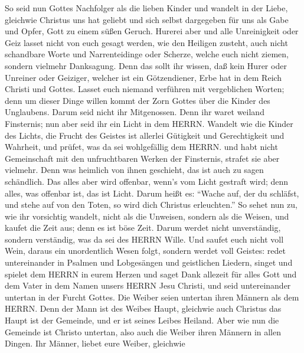  So seid nun Gottes Nachfolger als die lieben Kinder
 und wandelt in der Liebe, gleichwie Christus uns hat
geliebt und sich selbst dargegeben für uns als Gabe und Opfer, Gott zu
einem süßen Geruch.  Hurerei aber und alle Unreinigkeit oder
Geiz lasset nicht von euch gesagt werden, wie den Heiligen zusteht,
 auch nicht schandbare Worte und Narrenteidinge oder
Scherze, welche euch nicht ziemen, sondern vielmehr Danksagung.
 Denn das sollt ihr wissen, daß kein Hurer oder Unreiner
oder Geiziger, welcher ist ein Götzendiener, Erbe hat in dem Reich
Christi und Gottes.  Lasset euch niemand verführen mit
vergeblichen Worten; denn um dieser Dinge willen kommt der Zorn Gottes
über die Kinder des Unglaubens.  Darum seid nicht ihr
Mitgenossen.  Denn ihr waret weiland Finsternis; nun aber
seid ihr ein Licht in dem HERRN.  Wandelt wie die Kinder des
Lichts, die Frucht des Geistes ist allerlei Gütigkeit und Gerechtigkeit
und Wahrheit,  und prüfet, was da sei wohlgefällig dem
HERRN.  und habt nicht Gemeinschaft mit den unfruchtbaren
Werken der Finsternis, strafet sie aber vielmehr.  Denn was
heimlich von ihnen geschieht, das ist auch zu sagen schändlich.
 Das alles aber wird offenbar, wenn's vom Licht gestraft
wird; denn alles, was offenbar ist, das ist Licht.  Darum
heißt es: ``Wache auf, der du schläfst, und stehe auf von den Toten, so
wird dich Christus erleuchten.''  So sehet nun zu, wie ihr
vorsichtig wandelt, nicht als die Unweisen, sondern als die Weisen,
 und kaufet die Zeit aus; denn es ist böse Zeit.
 Darum werdet nicht unverständig, sondern verständig, was
da sei des HERRN Wille.  Und saufet euch nicht voll Wein,
daraus ein unordentlich Wesen folgt, sondern werdet voll Geistes:
 redet untereinander in Psalmen und Lobgesängen und
geistlichen Liedern, singet und spielet dem HERRN in eurem Herzen
 und saget Dank allezeit für alles Gott und dem Vater in
dem Namen unsers HERRN Jesu Christi,  und seid
untereinander untertan in der Furcht Gottes.  Die Weiber
seien untertan ihren Männern als dem HERRN.  Denn der Mann
ist des Weibes Haupt, gleichwie auch Christus das Haupt ist der
Gemeinde, und er ist seines Leibes Heiland.  Aber wie nun
die Gemeinde ist Christo untertan, also auch die Weiber ihren Männern in
allen Dingen.  Ihr Männer, liebet eure Weiber, gleichwie
